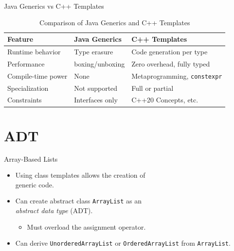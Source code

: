 \documentclass[14pt,aspectratio=1610, hyperref={pdfpagelayout=SinglePage}]{beamer}
\begin{document}
\begin{frame}{Java Generics vs C++ Templates}
  \begin{table}[h!]
\centering\small
\begin{tabular}{lll}
\toprule
\textbf{Feature} & \textbf{Java Generics} & \textbf{C++ Templates} \\
\midrule
Runtime behavior & Type erasure  & Code generation per type \\
Performance      & boxing/unboxing & Zero overhead, fully typed \\
Compile-time power & None & Metaprogramming, \texttt{constexpr} \\
Specialization   & Not supported & Full or partial \\
Constraints      & Interfaces only & C++20 Concepts, etc. \\
\bottomrule
\end{tabular}
\caption{Comparison of Java Generics and C++ Templates}
\end{table}

\end{frame}


\section*{ADT}
\begin{frame}{Array-Based Lists}
\protect\hypertarget{array-based-lists-revisited}{}
\begin{itemize}
\item
  Using class templates allows the creation of\\ generic code.
\item
  Can create abstract class \lstinline{ArrayList} as an\\ \emph{abstract data type} (ADT).
  \begin{itemize}
  \item
    Must overload the assignment operator.
  \end{itemize}
\item
  Can derive \lstinline{UnorderedArrayList} or \lstinline{OrderedArrayList} from
  \lstinline{ArrayList}.
\end{itemize}
\end{frame}
\end{document}
